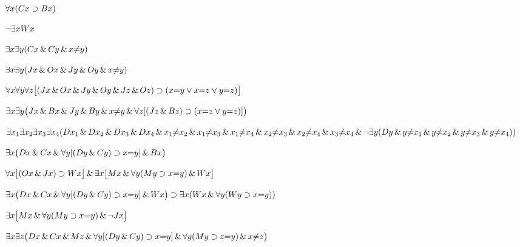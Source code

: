 \begin{earg}
\item %
$\forall x(Cx \supset Bx)$
\item %
$\neg\exists x Wx$
\item %
$\exists x \exists y(Cx \,\&\, Cy \,\&\, x{\neq} y)$
\item %
$\exists x \exists y(Jx \,\&\, Ox \,\&\, Jy \,\&\, Oy \,\&\, x{\neq} y)$
\item %
$\forall x\forall y\forall z\bigl[(Jx \,\&\, Ox \,\&\, Jy \,\&\, Oy \,\&\, Jz \,\&\, Oz)\supset(x{=}y \vee x{=}z \vee y{=}z)\bigr]$
\item %
$\exists x\exists y\bigl(Jx \,\&\, Bx \,\&\, Jy \,\&\, By \,\&\, x {\neq} y\,\&\, \forall z[(Jz \,\&\, Bz) \supset (x{=}z \vee y{=}z)]\bigr)$
\item %
$\exists x_1\exists x_2\exists x_3\exists x_4 (Dx_1 \,\&\, Dx_2 \,\&\, Dx_3 \,\&\, Dx_4 \,\&\, x_1 {\neq} x_2 \,\&\, x_1 {\neq} x_3 \,\&\, x_1 {\neq} x_4 \,\&\, x_2 {\neq} x_3 \,\&\, x_2 {\neq} x_4 \,\&\, x_3 {\neq} x_4 \\  \,\&\, \neg\exists y(Dy \,\&\, y{\neq} x_1 \,\&\, y{\neq}x_2 \,\&\, y{\neq} x_3 \,\&\, y{\neq} x_4))$
\item %
$\exists x\bigl(Dx \,\&\, Cx \,\&\, \forall y[(Dy\,\&\, Cy) \supset x{=}y] \,\&\, Bx\bigr)$
\item %
$\forall x\bigl[(Ox \,\&\, Jx) \supset Wx\bigr] \,\&\, \exists x\bigl[Mx \,\&\, \forall y(My \supset x{=}y) \,\&\, Wx\bigr]$
\item %
$\exists x\bigl(Dx \,\&\, Cx \,\&\, \forall y[(Dy\,\&\, Cy) \supset x{=}y] \,\&\, Wx\bigr)\supset \exists x (Wx \,\&\, \forall y(Wy \supset x{=}y))$
\item %
$\exists x\bigl[Mx \,\&\, \forall y(My \supset x{=}y) \,\&\, \neg Jx\bigr]$
\item %
$\exists x\exists z\bigl(Dx \,\&\, Cx \,\&\, Mz \,\&\, \forall y[(Dy\,\&\, Cy) \supset x{=}y]  \,\&\, \forall y (My \supset z{=}y) \,\&\, x{\neq} z \bigr)$
\end{earg}





